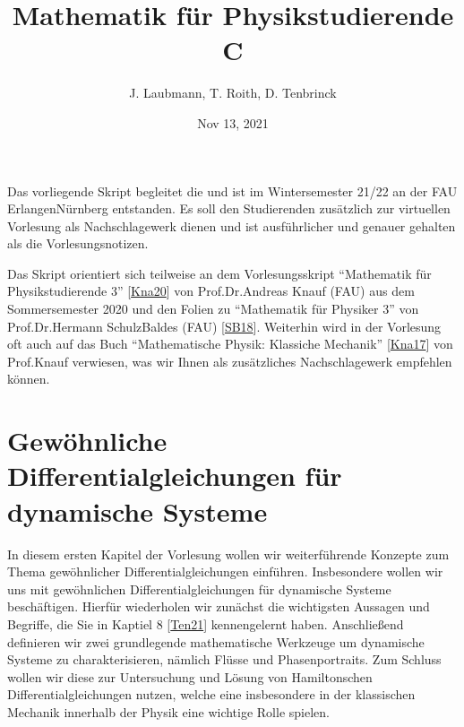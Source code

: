 \documentclass[letterpaper,10pt,english]{jupyterBook}
\title{Mathematik für Physikstudierende C}
\date{Nov 13, 2021}
\author{J.\@{} Laubmann, T.\@{} Roith, D.\@{} Tenbrinck}
\begin{document}
\pagestyle{empty}
\sphinxmaketitle
\pagestyle{plain}
\sphinxtableofcontents
\pagestyle{normal}
\label{\detokenize{intro::doc}}


\noindent{}

\sphinxAtStartPar
Das vorliegende Skript begleitet die  und ist im Wintersemester 21/22 an der FAU Erlangen\sphinxhyphen{}Nürnberg entstanden. Es soll den Studierenden zusätzlich zur virtuellen Vorlesung als Nachschlagewerk dienen und ist ausführlicher und genauer gehalten als die Vorlesungsnotizen.

\begin{DUlineblock}{0em}
\item[] 
\end{DUlineblock}

\sphinxAtStartPar
Das Skript orientiert sich teilweise an dem Vorlesungsskript “Mathematik für Physikstudierende 3” {[}\hyperlink{cite.references:id7}{Kna20}{]} von Prof.Dr.Andreas Knauf (FAU) aus dem Sommersemester 2020 und den Folien zu “Mathematik für Physiker 3” von Prof.Dr.Hermann Schulz\sphinxhyphen{}Baldes (FAU) {[}\hyperlink{cite.references:id10}{SB18}{]}. Weiterhin wird in der Vorlesung oft auch auf das Buch “Mathematische Physik: Klassiche Mechanik” {[}\hyperlink{cite.references:id8}{Kna17}{]} von Prof.Knauf verwiesen, was wir Ihnen als zusätzliches Nachschlagewerk empfehlen können.


\chapter{Gewöhnliche Differentialgleichungen für dynamische Systeme}
\label{\detokenize{ode/ode:gewohnliche-differentialgleichungen-fur-dynamische-systeme}}\label{\detokenize{ode/ode::doc}}
\sphinxAtStartPar
In diesem ersten Kapitel der Vorlesung wollen wir weiterführende Konzepte zum Thema gewöhnlicher Differentialgleichungen einführen.
Insbesondere wollen wir uns mit gewöhnlichen Differentialgleichungen für dynamische Systeme beschäftigen.
Hierfür wiederholen wir zunächst die wichtigsten Aussagen und Begriffe, die Sie in Kaptiel 8 {[}\hyperlink{cite.references:id12}{Ten21}{]} kennengelernt haben.
Anschließend definieren wir zwei grundlegende mathematische Werkzeuge um dynamische Systeme zu charakterisieren, nämlich Flüsse und Phasenportraits.
Zum Schluss wollen wir diese zur Untersuchung und Lösung von Hamiltonschen Differentialgleichungen nutzen, welche eine insbesondere in der klassischen Mechanik innerhalb der Physik eine wichtige Rolle spielen.
\end{document}
